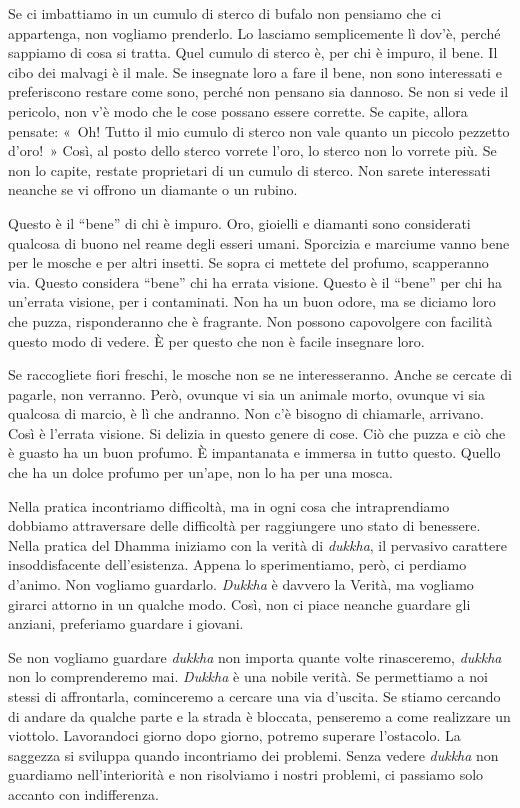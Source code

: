 Se ci imbattiamo in un cumulo di sterco di bufalo non pensiamo che ci
appartenga, non vogliamo prenderlo. Lo lasciamo semplicemente lì dov'è,
perché sappiamo di cosa si tratta. Quel cumulo di sterco è, per chi è
impuro, il bene. Il cibo dei malvagi è il male. Se insegnate loro a fare
il bene, non sono interessati e preferiscono restare come sono, perché
non pensano sia dannoso. Se non si vede il pericolo, non v'è modo che le
cose possano essere corrette. Se capite, allora pensate: «~Oh! Tutto il
mio cumulo di sterco non vale quanto un piccolo pezzetto d'oro!~» Così,
al posto dello sterco vorrete l'oro, lo sterco non lo vorrete più. Se
non lo capite, restate proprietari di un cumulo di sterco. Non sarete
interessati neanche se vi offrono un diamante o un rubino.

Questo è il ``bene'' di chi è impuro. Oro, gioielli e diamanti sono
considerati qualcosa di buono nel reame degli esseri umani. Sporcizia e
marciume vanno bene per le mosche e per altri insetti. Se sopra ci
mettete del profumo, scapperanno via. Questo considera ``bene'' chi ha
errata visione. Questo è il ``bene'' per chi ha un'errata visione, per i
contaminati. Non ha un buon odore, ma se diciamo loro che puzza,
risponderanno che è fragrante. Non possono capovolgere con facilità
questo modo di vedere. È per questo che non è facile insegnare loro.

Se raccogliete fiori freschi, le mosche non se ne interesseranno. Anche
se cercate di pagarle, non verranno. Però, ovunque vi sia un animale
morto, ovunque vi sia qualcosa di marcio, è lì che andranno. Non c'è
bisogno di chiamarle, arrivano. Così è l'errata visione. Si delizia in
questo genere di cose. Ciò che puzza e ciò che è guasto ha un buon
profumo. È impantanata e immersa in tutto questo. Quello che ha un dolce
profumo per un'ape, non lo ha per una mosca.

Nella pratica incontriamo difficoltà, ma in ogni cosa che intraprendiamo
dobbiamo attraversare delle difficoltà per raggiungere uno stato di
benessere. Nella pratica del Dhamma iniziamo con la verità di
\emph{dukkha}, il pervasivo carattere insoddisfacente dell'esistenza.
Appena lo sperimentiamo, però, ci perdiamo d'animo. Non vogliamo
guardarlo. \emph{Dukkha} è davvero la Verità, ma vogliamo girarci
attorno in un qualche modo. Così, non ci piace neanche guardare gli
anziani, preferiamo guardare i giovani.

Se non vogliamo guardare \emph{dukkha} non importa quante volte
rinasceremo, \emph{dukkha} non lo comprenderemo mai. \emph{Dukkha} è una
nobile verità. Se permettiamo a noi stessi di affrontarla, cominceremo a
cercare una via d'uscita. Se stiamo cercando di andare da qualche parte
e la strada è bloccata, penseremo a come realizzare un viottolo.
Lavorandoci giorno dopo giorno, potremo superare l'ostacolo. La saggezza
si sviluppa quando incontriamo dei problemi. Senza vedere \emph{dukkha}
non guardiamo nell'interiorità e non risolviamo i nostri problemi, ci
passiamo solo accanto con indifferenza.

